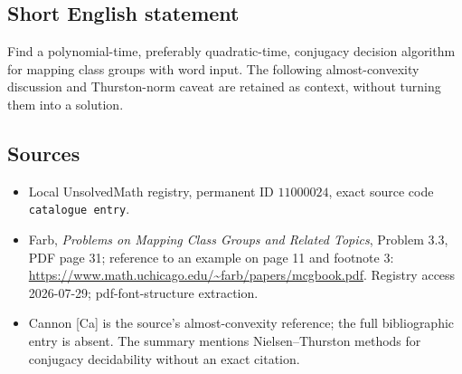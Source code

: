 \documentclass[11pt]{article}
\begin{document}
\subsection{Short English statement}
Find a polynomial-time, preferably quadratic-time, conjugacy decision algorithm for mapping class groups with word input. The following almost-convexity discussion and Thurston-norm caveat are retained as context, without turning them into a solution.
\subsection{Sources}
\begin{itemize}
\item Local UnsolvedMath registry, permanent ID \(11000024\), exact source code \texttt{catalogue entry}.
\item Farb, \emph{Problems on Mapping Class Groups and Related Topics}, Problem 3.3, PDF page 31; reference to an example on page 11 and footnote 3: \url{https://www.math.uchicago.edu/~farb/papers/mcgbook.pdf}. Registry access 2026-07-29; pdf-font-structure extraction.
\item Cannon [Ca] is the source's almost-convexity reference; the full bibliographic entry is absent. The summary mentions Nielsen--Thurston methods for conjugacy decidability without an exact citation.
\end{itemize}
\end{document}
